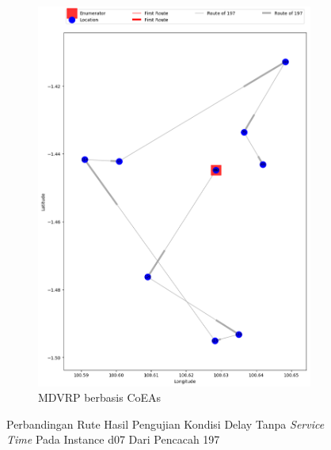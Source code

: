 \begin{figure}[H]
	\centering
	\begin{subfigure}[t]{\textwidth}
		\centering
		\includegraphics[width=\textwidth]{Resources/Images/delayed_7/real_m15_n100_delayed_7_197_coes}
		\caption{MDVRP berbasis CoEAs}
		\label{fig:real_m15_n100_delayed_7_197_coes}
	\end{subfigure}
	\caption{Perbandingan Rute Hasil Pengujian Kondisi Delay Tanpa \textit{Service Time} Pada Instance d07 Dari Pencacah 197}
	\label{fig:real_m15_n100_delayed_7_197}
\end{figure}


